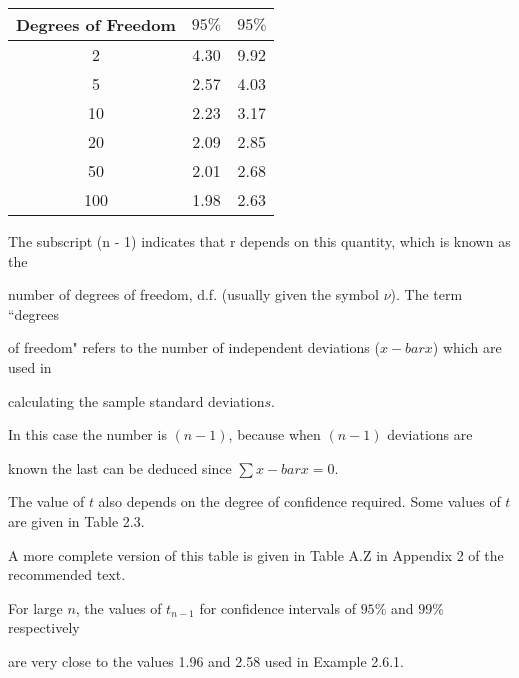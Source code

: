 \begin{tabular}{|c|c|c|}

  \hline


  Degrees of Freedom & $95\%$ & $95\%$ \\ \hline

  2 & 4.30 & 9.92 \\

  5 & 2.57  & 4.03 \\

  10 & 2.23 & 3.17 \\

  20 & 2.09 & 2.85 \\

  50 & 2.01 & 2.68 \\

  100 & 1.98 & 2.63 \\

  \hline

\end{tabular}

 



The subscript (n - 1) indicates that r depends on this quantity, which is known as the

number of degrees of freedom, d.f. (usually given the symbol $\nu$). The term ``degrees

of freedom" refers to the number of independent deviations ($x-bar{x}$) which are used in

calculating the sample standard deviation$s$.

 

In this case the number is $(n- 1)$, because when $(n - 1)$ deviations are

known the last can be deduced since $\sum x-bar{x} = 0$.

 

The value of $t$ also depends on the degree of confidence required. Some values of $t$ are given in Table 2.3.

A more complete version of this table is given in Table A.Z in Appendix 2 of the recommended text.

 

For large $n$, the values of $t_{n-1}$ for confidence intervals of $95\%$ and $99\%$ respectively

are very close to the values 1.96 and 2.58 used in Example 2.6.1.

